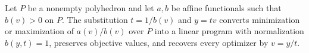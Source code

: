 Let \(P\) be a nonempty polyhedron and let \(a,b\) be affine functionals such that \(b(v)>0\) on \(P\).  The substitution \(t=1/b(v)\) and \(y=tv\) converts minimization or maximization of \(a(v)/b(v)\) over \(P\) into a linear program with normalization \(b(y,t)=1\), preserves objective values, and recovers every optimizer by \(v=y/t\).